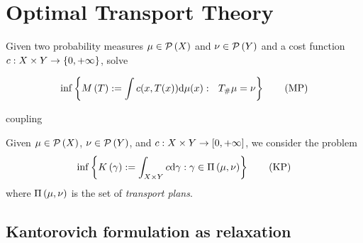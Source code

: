 \chapter{Optimal Transport Theory}
\begin{problem} Given two probability measures $\mu \in \mathcal{P}\left( X \right)$ and $\nu \in \mathcal{P}\left( Y \right)$ and a cost function $c: X \times Y \rightarrow \left\lbrace 0, +\infty \right\rbrace$, solve
	
	\begin{equation}
		\inf\left\lbrace M\left(T\right):=\int c(x, T(x)) \mathrm{d} \mu(x): \ \ T_\# \mu=\nu  \right\rbrace\label{eq: Monge's Problem.}\tag{MP}
	\end{equation}
\end{problem}


\begin{definition}{coupling}
	
\end{definition}


\begin{problem}Given $\mu \in \mathcal{P}\left( X \right)$, $\nu \in \mathcal{P}\left( Y \right)$, and $c: X\times Y \rightarrow \left[ 0, +\infty \right]$, we consider the problem
	\begin{equation}
		\inf\left\lbrace K\left(\gamma\right) := \int_{X\times Y} c \mathrm{d}\gamma : \gamma \in \Pi\left(\mu, \nu\right) \right\rbrace\label{eq: Kantorovich's Problem.}\tag{KP}
	\end{equation}
where $\Pi\left(\mu, \nu\right)$ is the set of \textit{transport plans}.
\end{problem}
\section{Kantorovich formulation as relaxation}